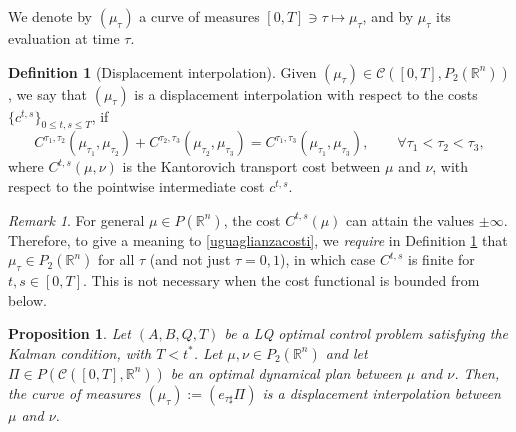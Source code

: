 \documentclass[reqno]{amsart}
\theoremstyle{plain}
\newtheorem{prop}[thm]{Proposition}
\theoremstyle{definition}
\newtheorem{Def}[thm]{Definition}
\theoremstyle{remark}
\newtheorem{rem}[thm]{Remark}
\newcommand{\R}{\mathbb{R}}
\begin{document}
	We denote by $(\mu_\tau)$ a curve of measures $[0,T]\ni \tau\mapsto\mu_\tau$, and by $\mu_\tau$ its evaluation at time $\tau$. 
 
    
    \begin{Def}[Displacement interpolation]\label{def_displ_interp}
        Given $(\mu_\tau)\in\mathcal{C}([0,T],P_2(\mathbb{R}^n))$, we say that $(\mu_\tau)$ is a displacement interpolation with respect to the costs $\{c^{t,s}\}_{0\leq t,s\leq T}$, if 
		\begin{equation}\label{uguaglianzacosti}
			 C^{\tau_1,\tau_2}(\mu_{\tau_1},\mu_{\tau_2})+C^{\tau_2,\tau_3}(\mu_{\tau_2},\mu_{\tau_3})=C^{\tau_1,\tau_3}(\mu_{\tau_1},\mu_{\tau_3}), \qquad\forall \tau_1 < \tau_2 < \tau_3,
		\end{equation}
		where $C^{t,s}(\mu,\nu)$ is the Kantorovich transport cost between $\mu$ and $\nu$, with respect to the pointwise intermediate cost $c^{t,s}$.
    \end{Def}
    \begin{rem}
For general $\mu \in P(\R^n)$, the cost $C^{t,s}(\mu)$ can attain the values $\pm \infty$. Therefore, to give a meaning to \eqref{uguaglianzacosti}, we \emph{require} in Definition \ref{def_displ_interp} that $\mu_\tau \in P_2(\R^n)$ for all $\tau$ (and not just $\tau=0,1$), in which case $C^{t,s}$ is finite for $t,s \in [0,T]$. This is not necessary when the cost functional is bounded from below.
    \end{rem}
    \begin{prop}
        		Let $(A,B,Q,T)$ be a LQ optimal control problem satisfying the Kalman condition, with $T<t^*$. Let $\mu,\nu\in P_2(\mathbb{R}^n)$ and let $\Pi\in P(\mathcal{C}([0,T],\mathbb{R}^n))$ be an optimal dynamical plan between $\mu$ and $\nu$. Then, the curve of measures $(\mu_\tau):=(e_{\tau\sharp}\Pi)$ is a displacement interpolation between $\mu$ and $\nu$.
    \end{prop}
\end{document}
